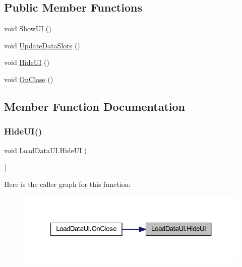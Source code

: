 \subsection*{Public Member Functions}
\begin{DoxyCompactItemize}
\item 
void \mbox{\hyperlink{class_load_data_u_i_ac0ab99a18f93b2092d30e1ecea86154d}{Show\+UI}} ()
\item 
void \mbox{\hyperlink{class_load_data_u_i_a2a36a17c6455a8ca8ee3b92dbbce0503}{Update\+Data\+Slots}} ()
\item 
void \mbox{\hyperlink{class_load_data_u_i_a7909089cf85db5310a5659a7f671b203}{Hide\+UI}} ()
\item 
void \mbox{\hyperlink{class_load_data_u_i_a5d74ebc8dc0756974c13087df72872f0}{On\+Close}} ()
\end{DoxyCompactItemize}


\subsection{Member Function Documentation}
\mbox{\label{class_load_data_u_i_a7909089cf85db5310a5659a7f671b203}} 
\subsubsection{\texorpdfstring{HideUI()}{HideUI()}}
{\footnotesize\ttfamily void Load\+Data\+U\+I.\+Hide\+UI (\begin{DoxyParamCaption}{ }\end{DoxyParamCaption})}

Here is the caller graph for this function\+:
\nopagebreak
\begin{figure}[H]
\begin{center}
\leavevmode
\includegraphics[width=321pt]{class_load_data_u_i_a7909089cf85db5310a5659a7f671b203_icgraph}
\end{center}
\end{figure}
\mbox{\label{class_load_data_u_i_a5d74ebc8dc0756974c13087df72872f0}} 
